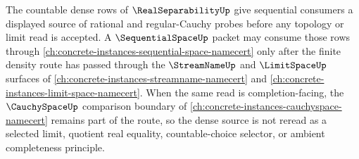 The countable dense rows of $\RealSeparabilityUp$ give sequential consumers a displayed source of rational and regular-Cauchy probes before any topology or limit read is accepted. A $\SequentialSpaceUp$ packet may consume those rows through \autoref{ch:concrete-instances-sequential-space-namecert} only after the finite density route has passed through the $\StreamNameUp$ and $\LimitSpaceUp$ surfaces of \autoref{ch:concrete-instances-streamname-namecert} and \autoref{ch:concrete-instances-limit-space-namecert}. When the same read is completion-facing, the $\CauchySpaceUp$ comparison boundary of \autoref{ch:concrete-instances-cauchyspace-namecert} remains part of the route, so the dense source is not reread as a selected limit, quotient real equality, countable-choice selector, or ambient completeness principle.
